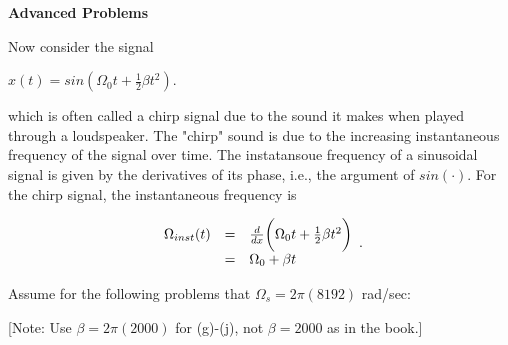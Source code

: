 \begin{LARGE}
  \textbf{Advanced Problems}
\end{LARGE}

\hspace*{\fill}

Now consider the signal

\begin{center}
$x(t) = sin(\Omega_0 t + \frac{1}{2}\beta t^2)$.\\
\end{center}

which is often called a chirp signal due to the sound it makes when played through a loudspeaker. The "chirp" sound is due to the increasing instantaneous frequency of the signal over time. The instatansoue frequency of a sinusoidal signal is given by the derivatives of its phase, i.e., the argument of $sin(\cdot)$. For the chirp signal, the instantaneous frequency is

\[ 
  \begin{array}{c c l}
    \Omega_{inst}(t) & = & \text{$\frac{ d}{d x} \bigg( \Omega_0 t + \frac{1}{2} \beta t^2 \bigg)$} \\
     & = &  \text{$ \Omega_0 + \beta t$}
  \end{array} .\]


Assume for the following problems that $\Omega_s = 2\pi(8192)$ rad/sec:

\begin{center}
[Note: Use $\beta = 2\pi(2000)$ for (g)-(j), not $\beta = 2000$ as in the book.]
\end{center}
